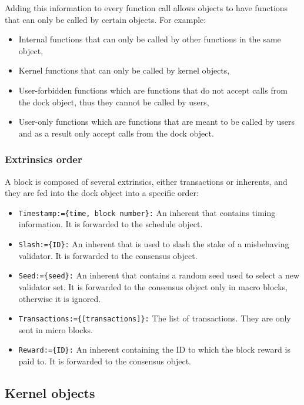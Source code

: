 \documentclass[conference]{IEEEtran}
\begin{document}
Adding this information to every function call allows objects to have functions that can only be called by certain objects. For example:

\begin{itemize}
	\item Internal functions that can only be called by other functions in the same object,
	\item Kernel functions that can only be called by kernel objects,
	\item User-forbidden functions which are functions that do not accept calls from the dock object, thus they cannot be called by users,
	\item User-only functions which are functions that are meant to be called by users and as a result only accept calls from the dock object.
\end{itemize}

\subsubsection{Extrinsics order}
A block is composed of several extrinsics, either transactions or inherents, and they are fed into the dock object into a specific order:

\begin{itemize}
	\item \texttt{Timestamp:=\{time, block number\}:} An inherent that contains timing information. It is forwarded to the schedule object.
	\item \texttt{Slash:=\{ID\}:} An inherent that is used to slash the stake of a misbehaving validator. It is forwarded to the consensus object.
	\item \texttt{Seed:=\{seed\}:} An inherent that contains a random seed used to select a new validator set. It is forwarded to the consensus object only in macro blocks, otherwise it is ignored.
	\item \texttt{Transactions:=\{[transactions]\}:} The list of transactions. They are only sent in micro blocks.
	\item \texttt{Reward:=\{ID\}:} An inherent containing the ID to which the block reward is paid to. It is forwarded to the consensus object.
\end{itemize}

\subsection{Kernel objects}
\end{document}
